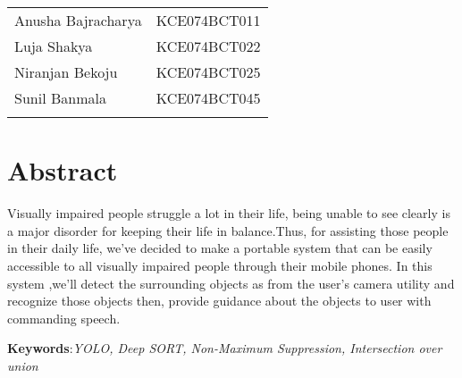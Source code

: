 			\begin{tabular}{p{2in}p{3in}}
    			Anusha Bajracharya & KCE074BCT011\\
    			Luja Shakya & KCE074BCT022\\
    			Niranjan Bekoju & KCE074BCT025\\
    			Sunil Banmala & KCE074BCT045\\
    		 \vspace{0.3in}
    		\end{tabular}
		\break
		
		\large
			\chapter*{Abstract}
		\normalsize
		Visually impaired people struggle a lot in their life, being unable to see clearly is a major disorder for keeping their life in balance.Thus, for assisting those people in their daily life, we've decided to make a portable system that can be easily accessible to all visually impaired people through their mobile phones. In this system ,we'll detect the surrounding objects as from the user's camera utility and recognize those objects then, provide guidance about the objects to user with commanding speech. 

		\textbf{Keywords}:\textit{YOLO, Deep SORT, Non-Maximum Suppression, Intersection over union}

		\break

		\tableofcontents
		
		\break
		\pagebreak

		\listoffigures
		\break
	
	
	
		\Large
			\begingroup
				\let\clearpage\relax
